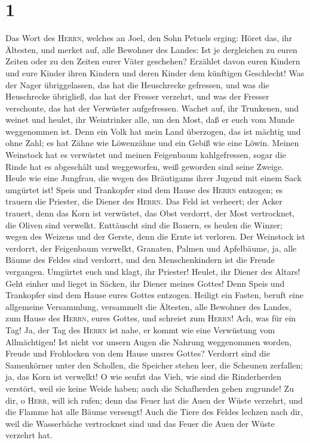 \hypertarget{section}{%
\section{1}\label{section}}

 Das Wort des \textsc{Herrn}, welches an Joel, den Sohn
Petuels erging:  Höret das, ihr Ältesten, und merket auf,
alle Bewohner des Landes: Ist je dergleichen zu euren Zeiten oder zu den
Zeiten eurer Väter geschehen?  Erzählet davon euren
Kindern und eure Kinder ihren Kindern und deren Kinder dem künftigen
Geschlecht!  Was der Nager übriggelassen, das hat die
Heuschrecke gefressen, und was die Heuschrecke übrigließ, das hat der
Fresser verzehrt, und was der Fresser verschonte, das hat der Verwüster
aufgefressen.  Wachet auf, ihr Trunkenen, und weinet und
heulet, ihr Weintrinker alle, um den Most, daß er euch vom Munde
weggenommen ist.  Denn ein Volk hat mein Land überzogen,
das ist mächtig und ohne Zahl; es hat Zähne wie Löwenzähne und ein Gebiß
wie eine Löwin.  Meinen Weinstock hat es verwüstet und
meinen Feigenbaum kahlgefressen, sogar die Rinde hat es abgeschält und
weggeworfen, weiß geworden sind seine Zweige.  Heule wie
eine Jungfrau, die wegen des Bräutigams ihrer Jugend mit einem Sack
umgürtet ist!  Speis und Trankopfer sind dem Hause des
\textsc{Herrn} entzogen; es trauern die Priester, die Diener des
\textsc{Herrn}.  Das Feld ist verheert; der Acker
trauert, denn das Korn ist verwüstet, das Obst verdorrt, der Most
vertrocknet, die Oliven sind verwelkt.  Enttäuscht sind
die Bauern, es heulen die Winzer; wegen des Weizens und der Gerste, denn
die Ernte ist verloren.  Der Weinstock ist verdorrt, der
Feigenbaum verwelkt, Granaten, Palmen und Apfelbäume, ja, alle Bäume des
Feldes sind verdorrt, und den Menschenkindern ist die Freude vergangen.
 Umgürtet euch und klagt, ihr Priester! Heulet, ihr
Diener des Altars! Geht einher und lieget in Säcken, ihr Diener meines
Gottes! Denn Speis und Trankopfer sind dem Hause eures Gottes entzogen.
 Heiligt ein Fasten, beruft eine allgemeine Versammlung,
versammelt die Ältesten, alle Bewohner des Landes, zum Hause des
\textsc{Herrn}, eures Gottes, und schreiet zum \textsc{Herrn}!
 Ach, was für ein Tag! Ja, der Tag des \textsc{Herrn} ist
nahe, er kommt wie eine Verwüstung vom Allmächtigen!  Ist
nicht vor unsern Augen die Nahrung weggenommen worden, Freude und
Frohlocken von dem Hause unsres Gottes?  Verdorrt sind
die Samenkörner unter den Schollen, die Speicher stehen leer, die
Scheunen zerfallen; ja, das Korn ist verwelkt!  O wie
seufzt das Vieh, wie sind die Rinderherden verstört, weil sie keine
Weide haben; auch die Schafherden gehen zugrunde!  Zu
dir, o \textsc{Herr}, will ich rufen; denn das Feuer hat die Auen der
Wüste verzehrt, und die Flamme hat alle Bäume versengt! 
Auch die Tiere des Feldes lechzen nach dir, weil die Wasserbäche
vertrocknet sind und das Feuer die Auen der Wüste verzehrt hat.

